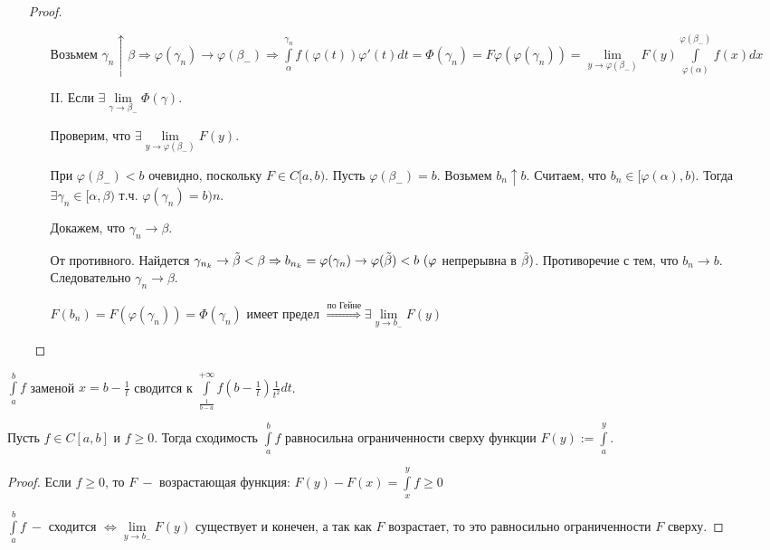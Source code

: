 \begin{statement}
\begin{enumerate}
\begin{proof}
\begin{enumerate}
                Возьмем $\gamma_n\uparrow \beta\Rightarrow \varphi(\gamma_n)\rightarrow \varphi(\beta_-)\Rightarrow \int\limits_{\alpha}^{\gamma_n}f(\varphi(t))\varphi'(t)dt=\Phi (\gamma_n)=F\varphi(\varphi(\gamma_n))=\lim\limits_{y\rightarrow \varphi(\beta_-)} F(y)\int\limits_{\varphi(\alpha)}^{\varphi(\beta_-)}f(x)dx$

                \item[II.] Если $\exists \lim\limits_{\gamma\rightarrow \beta_-} \Phi(\gamma)$.

                Проверим, что $\exists \lim\limits_{y\rightarrow \varphi(\beta_-)} F(y)$.

                При $\varphi(\beta_-)<b$ очевидно, поскольку $F\in C[a,b)$. Пусть $\varphi(\beta_-)=b$. Возьмем $b_n\uparrow b$. Считаем, что $b_n\in [\varphi(\alpha),b)$. Тогда $\exists \gamma_n\in [\alpha, \beta)$ т.ч. $\varphi(\gamma_n)=b)n$.

                Докажем, что $\gamma_n\rightarrow \beta$.

                От противного. Найдется $\gamma_{n_k}\rightarrow \Tilde{\beta}<\beta\Rightarrow b_{n_k}=\varphi(\gamma_n)\rightarrow \varphi(\Tilde{\beta})<b\ (\varphi$ непрерывна в $\Tilde{\beta})$. Противоречие с тем, что $b_n\rightarrow b$. Следовательно $\gamma_n\rightarrow \beta$.

                $F(b_n)=F(\varphi(\gamma_n))=\Phi(\gamma_n)$ имеет предел $\overset{\text{по Гейне}}{\Rightarrow}\exists \lim\limits_{y\rightarrow b_-}F(y)$
            \end{enumerate}
        \end{proof}
    \end{enumerate}
\end{statement}

\begin{remark}
    $\int\limits_a^b f$ заменой $x=b-\frac{1}{t}$ сводится к $\int\limits_{\frac{1}{b-a}}^{+\infty}f(b-\frac{1}{t})\frac{1}{t^2}dt$.
\end{remark}

\begin{theorem}
    Пусть $f\in C[a,b]$ и $f\geq 0$. Тогда сходимость $\int\limits_a^b f$ равносильна ограниченности сверху функции $F(y):=\int\limits_a^y$.
\end{theorem}

\begin{proof}
    Если $f\geq 0$, то $F\ -$ возрастающая функция: $F(y)-F(x)=\int\limits_x^y f\geq 0$

    $\int\limits_a^b f\ -$ сходится $\Leftrightarrow \lim\limits_{y\rightarrow b_-} F(y)$ существует и конечен, а так как $F$ возрастает, то это равносильно ограниченности $F$ сверху.
\end{proof}

